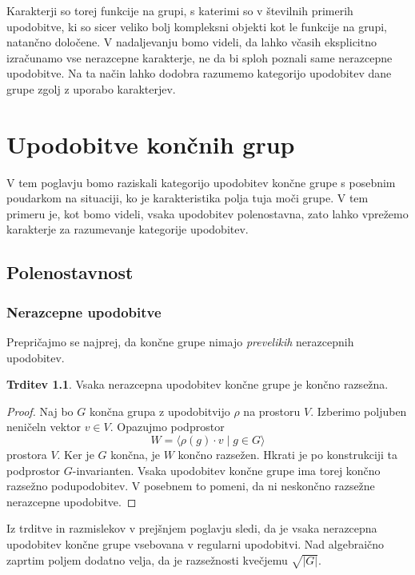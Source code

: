 \documentclass[11pt]{book}
\theoremstyle{definition}
\theoremstyle{zgled}
\theoremstyle{zgledbrezstevilke}
\theoremstyle{odprtproblem}
\theoremstyle{domacanaloga}
\newenvironment{dokaz}
    {\color{siva}\begin{proof}}
    {\end{proof}}
\theoremstyle{izrek}
\newtheorem{trditev}[theorem]{Trditev}
\begin{document}
Karakterji so torej funkcije na grupi, s katerimi so v številnih primerih upodobitve, ki so sicer veliko bolj kompleksni objekti kot le funkcije na grupi, natančno določene. V nadaljevanju bomo videli, da lahko včasih eksplicitno izračunamo vse nerazcepne karakterje, ne da bi sploh poznali same nerazcepne upodobitve. Na ta način lahko dodobra razumemo kategorijo upodobitev dane grupe zgolj z uporabo karakterjev.

\chapter{Upodobitve končnih grup}

V tem poglavju bomo raziskali kategorijo upodobitev končne grupe s posebnim poudarkom na situaciji, ko je karakteristika polja tuja moči grupe. V tem primeru je, kot bomo videli, vsaka upodobitev polenostavna, zato lahko vprežemo karakterje za razumevanje kategorije upodobitev.

\section{Polenostavnost}

\subsection{Nerazcepne upodobitve}

Prepričajmo se najprej, da končne grupe nimajo \emph{prevelikih} nerazcepnih upodobitev.

\begin{trditev}
Vsaka nerazcepna upodobitev končne grupe je končno razsežna.
\end{trditev}
\begin{dokaz}
Naj bo $G$ končna grupa z upodobitvijo $\rho$ na prostoru $V$. Izberimo poljuben neničeln vektor $v \in V$. Opazujmo podprostor
\[
    W = \langle \rho(g) \cdot v \mid g \in G \rangle
\]
prostora $V$. Ker je $G$ končna, je $W$ končno razsežen. Hkrati je po konstrukciji ta podprostor $G$-invarianten. Vsaka upodobitev končne grupe ima torej končno razsežno podupodobitev. V posebnem to pomeni, da ni neskončno razsežne nerazcepne upodobitve.
\end{dokaz}

Iz trditve in razmislekov v prejšnjem poglavju sledi, da je vsaka nerazcepna upodobitev končne grupe vsebovana v regularni upodobitvi. Nad algebraično zaprtim poljem dodatno velja, da je razsežnosti kvečjemu $\sqrt{|G|}$.
\end{document}
